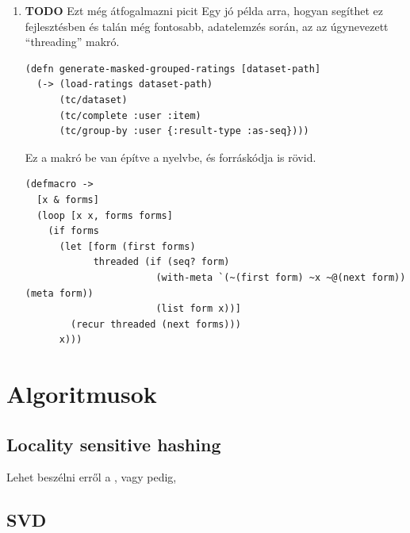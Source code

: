 \documentclass[final, 12pt] {ubb_dolgozat}
\begin{document}
\begin{enumerate}
\item {\bfseries\sffamily TODO} Ezt még átfogalmazni picit
\label{sec:org91f5f97}
Egy jó példa arra, hogyan segíthet ez fejlesztésben és talán még fontosabb, adatelemzés során, az az úgynevezett ``threading'' makró.

\begin{verbatim}
(defn generate-masked-grouped-ratings [dataset-path]
  (-> (load-ratings dataset-path)
      (tc/dataset)
      (tc/complete :user :item)
      (tc/group-by :user {:result-type :as-seq})))
\end{verbatim}

Ez a makró be van építve a nyelvbe, és forráskódja is rövid.

\begin{verbatim}
(defmacro ->
  [x & forms]
  (loop [x x, forms forms]
    (if forms
      (let [form (first forms)
            threaded (if (seq? form)
                       (with-meta `(~(first form) ~x ~@(next form)) (meta form))
                       (list form x))]
        (recur threaded (next forms)))
      x)))
\end{verbatim}
\end{enumerate}

\chapter{Algoritmusok}
\label{sec:org92a14c3}
\section{Locality sensitive hashing}
\label{sec:orge4d1368}
Lehet beszélni erről a \citep{charikarSimilarityEstimationTechniques}, vagy pedig,

\section{SVD}
\label{sec:org27215df}
\citep{brandFastOnlineSVD2003}



\end{document}
